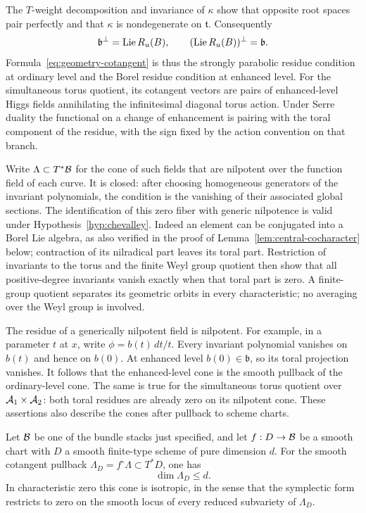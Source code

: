 The $T$-weight decomposition and invariance of $\kappa$ show that opposite
root spaces pair perfectly and that $\kappa$ is nondegenerate on
$\mathfrak t$.  Consequently
\[
 \mathfrak b^\perp=\operatorname{Lie} R_u(B),\qquad
 (\operatorname{Lie} R_u(B))^\perp=\mathfrak b.
\]
Formula~\eqref{eq:geometry-cotangent} is thus the strongly parabolic
residue condition at ordinary level and the Borel residue condition at
enhanced level.  For the simultaneous torus quotient, its cotangent
vectors are pairs of enhanced-level Higgs fields annihilating the
infinitesimal diagonal torus action.  Under Serre duality the functional
on a change of enhancement is pairing with the toral component of the
residue, with the sign fixed by the action convention on that branch.

Write $\Lambda\subset T^*\mathcal B$ for the cone of such fields that are
nilpotent over the function field of each curve.  It is closed: after
choosing homogeneous generators of the invariant polynomials, the
condition is the vanishing of their associated global sections.  The
identification of this zero fiber with generic nilpotence is valid under
Hypothesis~\ref{hyp:chevalley}.  Indeed an element can be conjugated into a Borel Lie
algebra, as also verified in the proof of
Lemma~\ref{lem:central-cocharacter} below; contraction of its nilradical
part leaves its toral part.  Restriction of invariants to the torus and
the finite Weyl group quotient then show that all positive-degree
invariants vanish exactly when that toral part is zero.  A finite-group
quotient separates its geometric orbits in every characteristic; no
averaging over the Weyl group is involved.

The residue of a generically nilpotent field is nilpotent.  For example,
in a parameter $t$ at $x$, write $\phi=b(t)\,dt/t$.  Every invariant
polynomial vanishes on $b(t)$ and hence on $b(0)$.  At enhanced level
$b(0)\in\mathfrak b$, so its toral projection vanishes.  It follows that
the enhanced-level cone is the smooth pullback of the ordinary-level
cone.  The same is true for the simultaneous torus quotient over
$\mathcal A_1\times\mathcal A_2$: both toral residues are already zero on its
nilpotent cone.  These assertions also describe the cones after
pullback to scheme charts.

\begin{proposition}\label{prop:cone-dimension}
Let $\mathcal B$ be one of the bundle stacks just specified, and let
$f:D\to\mathcal B$ be a smooth chart with $D$ a smooth finite-type scheme of
pure dimension $d$.  For the smooth cotangent pullback
$\Lambda_D=f^\circ\Lambda\subset T^*D$, one has
\begin{equation}\label{eq:geometry-cone-dimension}
                         \dim\Lambda_D\leq d.
\end{equation}
In characteristic zero this cone is isotropic, in the sense that the
symplectic form restricts to zero on the smooth locus of every reduced
subvariety of $\Lambda_D$.
\end{proposition}

